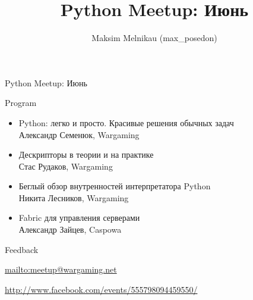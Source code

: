 \documentclass[aspectratio=169]{beamer}
\begin{document}
\title{Python Meetup: Июнь}
\author{Maksim Melnikau (max\_posedon)}
\date{}

\begin{frame}{Python Meetup: Июнь}
    \begin{block}{Program}
    \begin{itemize}
        \item Python: легко и просто. Красивые решения обычных задач\\Александр Семенюк, Wargaming
        \item Дескрипторы в теории и на практике\\Стас Рудаков, Wargaming
        \item Беглый обзор внутренностей интерпретатора Python\\Никита Лесников, Wargaming
        \item Fabric для управления серверами\\Александр Зайцев, Caspowa
    \end{itemize}
    \end{block}

    \begin{block}{Feedback}
    \par \url{mailto:meetup@wargaming.net}
    \par \url{http://www.facebook.com/events/555798094459550/}
    \end{block}
\end{frame}
\end{document}
